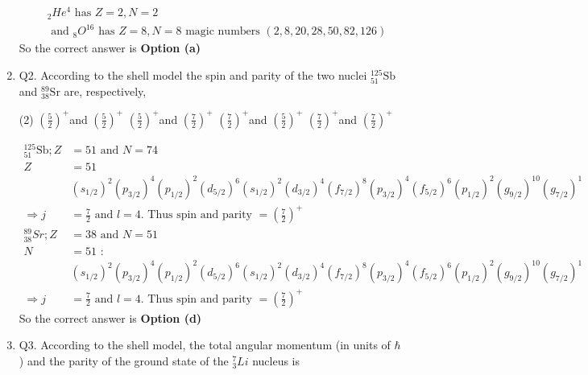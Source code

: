 \begin{enumerate}
\begin{answer}
\begin{align*}
		&{ }_2 H e^4\text{ has }Z=2, N=2\\
		&\text{	and }{ }_8 O^{16}\text{ has $Z=8, N=8$ magic numbers $(2,8,20,28,50,82,126)$}
		\end{align*}
		So the correct answer is \textbf{Option (a)}
	\end{answer}
	\item Q2. According to the shell model the spin and parity of the two nuclei ${ }_{51}^{125} \mathrm{Sb}$ and ${ }_{38}^{89} \mathrm{Sr}$ are, respectively,
	{}
	\begin{tasks}(2)
		\task[\textbf{a.}]$\left(\frac{5}{2}\right)^{+}$and $\left(\frac{5}{2}\right)^{+}$
		\task[\textbf{b.}]$\left(\frac{5}{2}\right)^{+}$and $\left(\frac{7}{2}\right)^{+}$
		\task[\textbf{c.}]$\left(\frac{7}{2}\right)^{+}$and $\left(\frac{5}{2}\right)^{+}$
		\task[\textbf{d.}] $\left(\frac{7}{2}\right)^{+}$and $\left(\frac{7}{2}\right)^{+}$
	\end{tasks}
	\begin{answer}
		\begin{align*}
		{ }_{51}^{125} \mathrm{Sb} ; Z&=51 \text { and } N=74\\
		Z&=51 \\
		&\left(s_{1 / 2}\right)^2\left(p_{3 / 2}\right)^4\left(p_{1 / 2}\right)^2\left(d_{5 / 2}\right)^6\left(s_{1 / 2}\right)^2\left(d_{3 / 2}\right)^4\left(f_{7 / 2}\right)^8\left(p_{3 / 2}\right)^4\left(f_{5 / 2}\right)^6\left(p_{1 / 2}\right)^2\left(g_{9 / 2}\right)^{10}\left(g_{7 / 2}\right)^1 \\
		\Rightarrow j&=\frac{7}{2} \text { and } l=4 \text {. Thus spin and parity }=\left(\frac{7}{2}\right)^{+} \\
		{ }_{38}^{89} S r ; Z&=38 \text { and } N=51 \\
		N&=51 \text { : } \\
		&\left(s_{1 / 2}\right)^2\left(p_{3 / 2}\right)^4\left(p_{1 / 2}\right)^2\left(d_{5 / 2}\right)^6\left(s_{1 / 2}\right)^2\left(d_{3 / 2}\right)^4\left(f_{7 / 2}\right)^8\left(p_{3 / 2}\right)^4\left(f_{5 / 2}\right)^6\left(p_{1 / 2}\right)^2\left(g_{9 / 2}\right)^{10}\left(g_{7 / 2}\right)^1 \\
		\Rightarrow j&=\frac{7}{2} \text { and } l=4 \text {. Thus spin and parity }=\left(\frac{7}{2}\right)^{+}
		\end{align*}
		So the correct answer is \textbf{Option (d)}
	\end{answer}
	\item Q3. According to the shell model, the total angular momentum (in units of $\hbar$ ) and the parity of the ground state of the ${ }_3^7 L i$ nucleus is

\end{enumerate}
